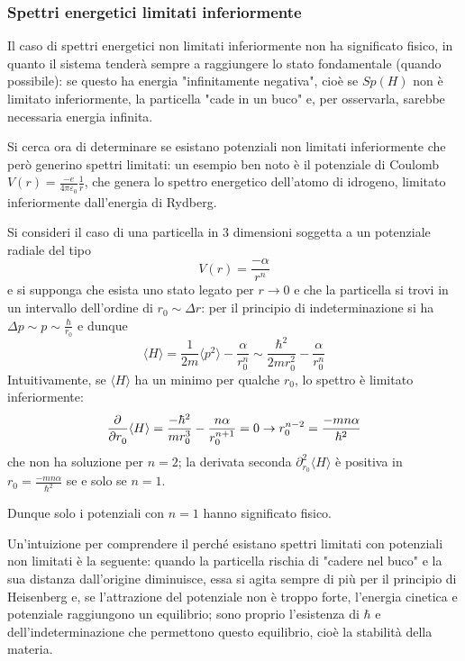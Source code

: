 
\subsubsection{Spettri energetici limitati inferiormente}
Il caso di spettri energetici non limitati inferiormente non ha significato fisico, in quanto il sistema
tenderà sempre a raggiungere lo stato fondamentale (quando possibile): se questo ha energia "infinitamente
negativa", cioè se $Sp(H)$ non è limitato inferiormente, la particella "cade in un buco" e, per osservarla,
sarebbe necessaria energia infinita.

Si cerca ora di determinare se esistano potenziali non limitati inferiormente che però generino spettri
limitati: un esempio ben noto è il potenziale di Coulomb $V(r) = \frac{-e}{4\pi\varepsilon_0}\frac{1}{r}$, che
genera lo spettro energetico dell'atomo di idrogeno, limitato inferiormente dall'energia di Rydberg.

Si consideri il caso di una particella in 3 dimensioni soggetta a un potenziale radiale del tipo
$$V(r) = \frac{-\alpha}{r^n}$$
e si supponga che esista uno stato legato per $r\to0$ e che la particella si trovi in un intervallo
dell'ordine di $r_0\sim\Delta r$: per il principio di indeterminazione si ha
$\Delta p \sim p \sim \frac{\hbar}{r_0}$ e dunque
$$\langle H \rangle = \frac{1}{2m}\langle p^2\rangle - \frac{\alpha}{r_0^n} \sim 
\frac{\hbar^2}{2mr_0^2} - \frac{\alpha}{r_0^n}$$
Intuitivamente, se $\langle H \rangle$ ha un minimo per qualche $r_0$, lo spettro è limitato inferiormente:
$$\pdv[]{}{r_0}\langle H \rangle = \frac{-\hbar^2}{mr_0^3} - \frac{n\alpha}{r_0^{n+1}} = 0 \to
r_0^{n-2} = \frac{-mn\alpha}{\hbar^2}
$$
che non ha soluzione per $n=2$; la derivata seconda $\partial^2_{r_0} \langle H \rangle$ è positiva in 
$r_0 = \frac{-mn\alpha}{\hbar^2}$ se e solo se $n=1$.

Dunque solo i potenziali con $n=1$ hanno significato fisico.

Un'intuizione per comprendere il perché esistano spettri limitati con potenziali non limitati è la
seguente: quando la particella rischia di "cadere nel buco" e la sua distanza dall'origine diminuisce, essa
si agita sempre di più per il principio di Heisenberg e, se l'attrazione del potenziale non è troppo forte,
l'energia cinetica e potenziale raggiungono un equilibrio; sono proprio l'esistenza di $\hbar$ e
dell'indeterminazione che permettono questo equilibrio, cioè la stabilità della materia.

